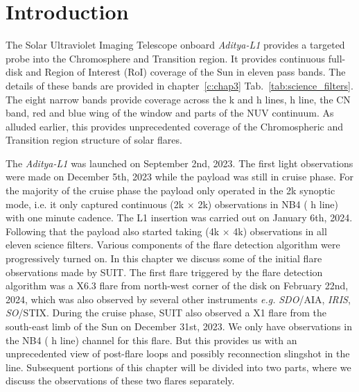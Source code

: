 \justifying

\section{Introduction} \label{sec:intro}

The Solar Ultraviolet Imaging Telescope onboard {\it Aditya-L1} \citep[{\it Aditya-L1}/SUIT,][]{article,ghosh16,adityal1,suit_main} provides a targeted probe into the Chromosphere and Transition region. It provides continuous full-disk and Region of Interest (RoI) coverage of the Sun in eleven pass bands. The details of these bands are provided in chapter~\ref{c:chap3} Tab.~\ref{tab:science_filters}. The eight narrow bands provide coverage across the  k and h lines,  h line, the CN band, red and blue wing of the  window and parts of the NUV continuum. As alluded earlier, this provides unprecedented coverage of the Chromospheric and Transition region structure of solar flares.

The {\it Aditya-L1} was launched on September 2nd, 2023. The first light observations were made on December 5th, 2023 while the payload was still in cruise phase. For the majority of the cruise phase the payload only operated in the 2k synoptic mode, i.e. it only captured continuous (2k $\times$ 2k) observations in NB4 ( h line) with one minute cadence. The L1 insertion was carried out on January 6th, 2024. Following that the payload also started taking (4k $\times$ 4k) observations in all eleven science filters. Various components of the flare detection algorithm were progressively turned on. In this chapter we discuss some of the initial flare observations made by SUIT. The first flare triggered by the flare detection algorithm was a X6.3 flare from north-west corner of the disk on February 22nd, 2024, which was also observed by several other instruments {\it e.g.} {\it SDO}/AIA, {\it IRIS}, {\it SO}/STIX. During the cruise phase, SUIT also observed a X1 flare from the south-east limb of the Sun on December 31st, 2023. We only have observations in the NB4 ( h line) channel for this flare. But this provides us with an unprecedented view of post-flare loops and possibly reconnection slingshot in the  line. Subsequent portions of this chapter will be divided into two parts, where we discuss the observations of these two flares separately.


